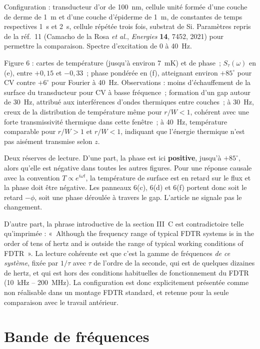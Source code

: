 \documentclass[11pt,a4paper]{article}
\begin{document}
Configuration : transducteur d'or de 100~nm, cellule unité formée d'une couche de derme de
1~\textmu m et d'une couche d'épiderme de 1~\textmu m, de constantes de temps respectives 1~s et
2~s, cellule répétée trois fois, substrat de Si. Paramètres repris de la réf.~11 (Camacho de la
Rosa \textit{et al.}, \textit{Energies} \textbf{14}, 7452, 2021) pour permettre la comparaison.
Spectre d'excitation de 0 à 40~Hz.

Figure 6 : cartes de température (jusqu'à environ 7~mK) et de phase~; $S_\tau(\omega)$ en (e),
entre $+0{,}15$ et $-0{,}33$~; phase pondérée en (f), atteignant environ $+85^\circ$ pour CV
contre $+6^\circ$ pour Fourier à 40~Hz. Observations : moins d'échauffement de la surface du
transducteur pour CV à basse fréquence~; formation d'un gap autour de 30~Hz, attribué aux
interférences d'ondes thermiques entre couches~; à 30~Hz, creux de la distribution de
température même pour $r/W < 1$, cohérent avec une forte transmissivité thermique dans cette
fenêtre~; à 40~Hz, température comparable pour $r/W > 1$ et $r/W < 1$, indiquant que l'énergie
thermique n'est pas aisément transmise selon $z$.

Deux réserves de lecture. D'une part, la phase est ici \textbf{positive}, jusqu'à $+85^\circ$,
alors qu'elle est négative dans toutes les autres figures. Pour une réponse causale avec la
convention $T \propto e^{i\omega t}$, la température de surface est en retard sur le flux et la
phase doit être négative. Les panneaux 6(c), 6(d) et 6(f) portent donc soit le retard $-\phi$,
soit une phase déroulée à travers le gap. L'article ne signale pas le changement.

D'autre part, la phrase introductive de la section III~C est contradictoire telle qu'imprimée :
«~Although the frequency range of typical FDTR systems is in the order of tens of hertz and is
outside the range of typical working conditions of FDTR~». La lecture cohérente est que c'est la
gamme de fréquences \textit{de ce système}, fixée par $1/\tau$ avec $\tau$ de l'ordre de la
seconde, qui est de quelques dizaines de hertz, et qui est hors des conditions habituelles de
fonctionnement du FDTR (10~kHz -- 200~MHz). La configuration est donc explicitement présentée
comme non réalisable dans un montage FDTR standard, et retenue pour la seule comparaison avec le
travail antérieur.

\section{Bande de fréquences}
\end{document}
